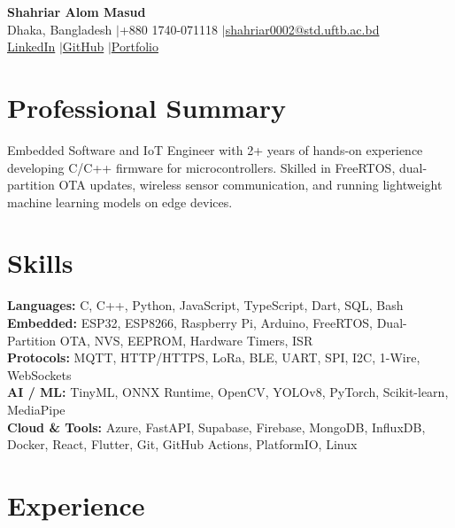 \documentclass[10pt,a4paper]{article}
\begin{document}
\pagestyle{empty}

\begin{center}
    {\LARGE \textbf{Shahriar Alom Masud}} \\[3pt]
    \small
    Dhaka, Bangladesh \enspace$|$\enspace +880 1740-071118 \enspace$|$\enspace \href{mailto:shahriar0002@std.uftb.ac.bd}{shahriar0002@std.uftb.ac.bd} \\[1pt]
    \href{https://www.linkedin.com/in/shahriar-alom-masud}{LinkedIn} \enspace$|$\enspace \href{https://github.com/Masud744}{GitHub} \enspace$|$\enspace \href{https://masud-hj9g.onrender.com/}{Portfolio}
\end{center}
\vspace{-3pt}

\section*{Professional Summary}
Embedded Software and IoT Engineer with 2+ years of hands-on experience developing C/C++ firmware for microcontrollers. Skilled in FreeRTOS, dual-partition OTA updates, wireless sensor communication, and running lightweight machine learning models on edge devices.

\section*{Skills}
\textbf{Languages:} C, C++, Python, JavaScript, TypeScript, Dart, SQL, Bash \\[1pt]
\textbf{Embedded:} ESP32, ESP8266, Raspberry Pi, Arduino, FreeRTOS, Dual-Partition OTA, NVS, EEPROM, Hardware Timers, ISR \\[1pt]
\textbf{Protocols:} MQTT, HTTP/HTTPS, LoRa, BLE, UART, SPI, I2C, 1-Wire, WebSockets \\[1pt]
\textbf{AI / ML:} TinyML, ONNX Runtime, OpenCV, YOLOv8, PyTorch, Scikit-learn, MediaPipe \\[1pt]
\textbf{Cloud \& Tools:} Azure, FastAPI, Supabase, Firebase, MongoDB, InfluxDB, Docker, React, Flutter, Git, GitHub Actions, PlatformIO, Linux

\section*{Experience}
\end{document}
